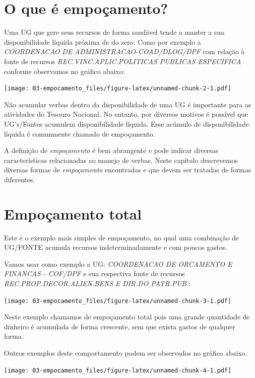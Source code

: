 \documentclass[
]{book}
\begin{document}
\hypertarget{o-que-uxe9-empouxe7amento}{%
\section{O que é empoçamento?}\label{o-que-uxe9-empouxe7amento}}

Uma UG que gere seus recursos de forma saudável tende a manter a sua disponibilidade líquida próxima de do zero. Como por exemplo a \emph{COORDENACAO DE ADMINISTRACAO-COAD/DLOG/DPF} com relação à fonte de recursos \emph{REC.VINC.APLIC.POLITICAS PUBLICAS ESPECIFICA} conforme observamos no gráfico abaixo:

\texttt{[image: 03-empocamento\_files/figure-latex/unnamed-chunk-2-1.pdf]}

Não acumular verbas dentro da disponibilidade de uma UG é importante para as atividades do Tesouro Nacional. No entanto, por diversos motivos é possível que UG's/Fontes acumulem disponibilidade líquida. Esse acúmulo de disponibilidade líquida é comunmente chamado de empoçamento.

A definição de \emph{empoçamento} é bem abrangente e pode indicar diversas características relacionadas ao manejo de verbas. Neste capítulo descrevemos diversas formas de \emph{empoçamento} encontradas e que devem ser tratadas de formas diferentes.

\hypertarget{empouxe7amento-total}{%
\section{Empoçamento total}\label{empouxe7amento-total}}

Este é o exemplo mais simples de empoçamento, no qual uma combinação de UG/FONTE acumula recursos indeterminadamente e com poucos gastos.

Vamos usar como exemplo a UG: \emph{COORDENACAO DE ORCAMENTO E FINANCAS - COF/DPF}
e sua respectiva fonte de recursos \emph{REC.PROP.DECOR.ALIEN.BENS E DIR.DO PATR.PUB.}:

\texttt{[image: 03-empocamento\_files/figure-latex/unnamed-chunk-3-1.pdf]}

Neste exemplo chamamos de empoçamento total pois uma grande quantidade de dinheiro é acumulada de forma crescente, sem que exista gastos de qualquer forma.

Outros exemplos deste comportamento podem ser observados no gráfico abaixo.

\texttt{[image: 03-empocamento\_files/figure-latex/unnamed-chunk-4-1.pdf]}
\end{document}
